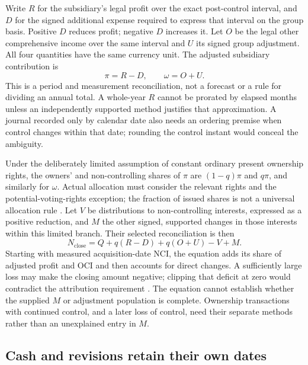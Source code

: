 Write $R$ for the subsidiary's legal profit over the exact post-control interval, and $D$ for the signed additional expense required to express that interval on the group basis. Positive $D$ reduces profit; negative $D$ increases it. Let $O$ be the legal other comprehensive income over the same interval and $U$ its signed group adjustment. All four quantities have the same currency unit. The adjusted subsidiary contribution is
\begin{equation}
 \pi=R-D,\qquad \omega=O+U.
 \label{eq:acquisition-post-control-results}
\end{equation}
This is a period and measurement reconciliation, not a forecast or a rule for dividing an annual total. A whole-year $R$ cannot be prorated by elapsed months unless an independently supported method justifies that approximation. A journal recorded only by calendar date also needs an ordering premise when control changes within that date; rounding the control instant would conceal the ambiguity.

Under the deliberately limited assumption of constant ordinary present ownership rights, the owners' and non-controlling shares of $\pi$ are $(1-q)\pi$ and $q\pi$, and similarly for $\omega$. Actual allocation must consider the relevant rights and the potential-voting-rights exception; the fraction of issued shares is not a universal allocation rule \citep[B89--B95]{aasb10control2026}. Let $V$ be distributions to non-controlling interests, expressed as a positive reduction, and $M$ the other signed, supported changes in those interests within this limited branch. Their selected reconciliation is then
\begin{equation}
 N_{\mathrm{close}}=Q+q(R-D)+q(O+U)-V+M.
 \label{eq:acquisition-nci-reconciliation}
\end{equation}
Starting with measured acquisition-date NCI, the equation adds its share of adjusted profit and OCI and then accounts for direct changes. A sufficiently large loss may make the closing amount negative; clipping that deficit at zero would contradict the attribution requirement \citep[B94]{aasb10control2026}. The equation cannot establish whether the supplied $M$ or adjustment population is complete. Ownership transactions with continued control, and a later loss of control, need their separate methods rather than an unexplained entry in $M$.

\subsection{Cash and revisions retain their own dates}

